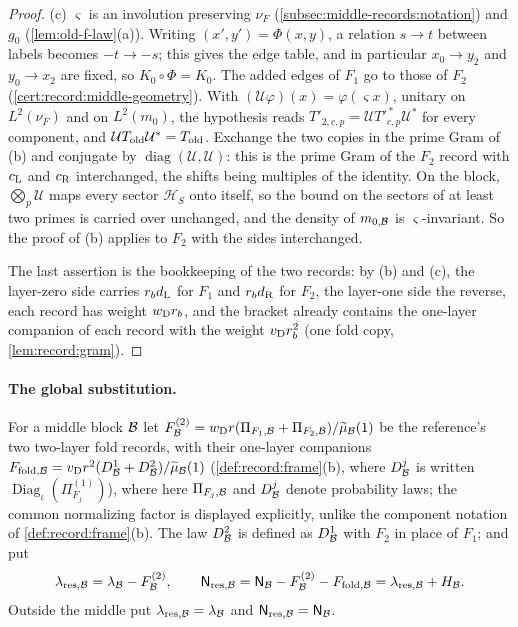 \begin{proof}
(c) $\varsigma$ is an involution preserving $\nu_F$
(\cref{subsec:middle-records:notation}) and $g_0$ (\cref{lem:old-f-law}(a)).
Writing
$(x',y')=\Phi(x,y)$, a relation $s\to t$ between labels becomes $-t\to-s$;
this gives the edge table, and in particular $x_0\to y_2$ and $y_0\to x_2$
are fixed, so $K_0\circ\Phi=K_0$. The added edges of $F_1$
go to those of $F_2$ (\cref{cert:record:middle-geometry}). With
$(\mathcal U\varphi)(x)=\varphi(\varsigma x)$, unitary on $L^2(\nu_F)$ and on
$L^2(m_0)$, the hypothesis reads $T'_{2,c,p}=\mathcal UT'^{\,*}_{c,p}\mathcal U^*$
for every component, and $\mathcal UT_{\rm old}\mathcal U^*=T_{\rm old}$. Exchange
the two copies in the prime Gram of (b) and conjugate by
$\operatorname{diag}(\mathcal U,\mathcal U)$: this is the prime Gram of the $F_2$
record with $c_{\rm L}$ and $c_{\rm R}$ interchanged, the shifts being multiples of
the identity. On the block, $\bigotimes_p\mathcal U$ maps every sector
$\mathcal H_S$ onto itself, so the bound on the sectors of at least two primes
is carried over unchanged, and the density of $m_{0,\mathcal B}$ is $\varsigma$-invariant.
So the proof of (b) applies to $F_2$ with the sides interchanged.

The last assertion is the bookkeeping of the two records: by (b) and (c),
the layer-zero side carries $r_bd_{\rm L}$ for $F_1$ and $r_bd_{\rm R}$ for
$F_2$, the layer-one side the reverse, each record has weight $w_{\rm D}r_b$, and
the bracket already contains the one-layer companion of each record with the
weight $v_{\rm D}r_b^2$ (one fold copy, \cref{lem:record:gram}).
\end{proof}

\paragraph{The global substitution.}
For a middle block $\mathcal B$ let
$F^{(2)}_\mathcal B=w_{\rm D}r(\Pi_{F_1,\mathcal B}+\Pi_{F_2,\mathcal B})/\widetilde\mu_\mathcal B(1)$ be the reference's two
two-layer fold records, with their one-layer companions
$F_{{\rm fold},\mathcal B}=v_{\rm D}r^2(D^1_\mathcal B+D^2_\mathcal B)/\widetilde\mu_\mathcal B(1)$ (\cref{def:record:frame}(b),
where $D^j_\mathcal B$ is written $\operatorname{Diag}_\iota(\Pi^{(1)}_{F_j})$),
where here $\Pi_{F_j,\mathcal B}$ and $D^j_\mathcal B$ denote probability laws;
the common normalizing factor is displayed explicitly, unlike the
component notation of \cref{def:record:frame}(b). The law
$D^2_\mathcal B$ is defined as
$D^1_\mathcal B$ with $F_2$ in place of $F_1$; and put
\[
 \lambda_{{\rm res},\mathcal B}=\lambda_\mathcal B-F^{(2)}_\mathcal B,\qquad
 \mathsf N_{{\rm res},\mathcal B}=\mathsf N_\mathcal B-F^{(2)}_\mathcal B-F_{{\rm fold},\mathcal B}
 =\lambda_{{\rm res},\mathcal B}+H_\mathcal B .
\]
Outside the middle put $\lambda_{{\rm res},\mathcal B}=\lambda_\mathcal B$ and
$\mathsf N_{{\rm res},\mathcal B}=\mathsf N_\mathcal B$.

